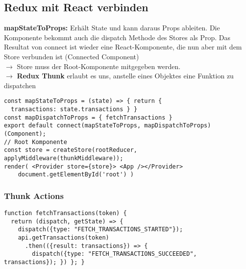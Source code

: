 \subsection{Redux mit React verbinden}
\textcolor{b}{\textbf{mapStateToProps:}} Erhält State und kann daraus Props ableiten. Die Komponente bekommt auch die dispatch Methode des Stores als Prop. Das Resultat von connect ist wieder eine React-Komponente, die nun aber mit dem Store verbunden ist (Connected Component)\\
$\rightarrow$ Store muss der Root-Komponente mitgegeben werden.\\
$\rightarrow$ \textbf{Redux Thunk} erlaubt es uns, anstelle eines Objektes eine Funktion zu dispatchen
\begin{lstlisting}[style=htmlcssjs]
const mapStateToProps = (state) => { return {
  transactions: state.transactions } }
const mapDispatchToProps = { fetchTransactions }
export default connect(mapStateToProps, mapDispatchToProps)(Component);
// Root Komponente
const store = createStore(rootReducer, applyMiddleware(thunkMiddleware));
render( <Provider store={store}> <App /></Provider>
    document.getElementById('root') )
\end{lstlisting}
\subsubsection{Thunk Actions}
\begin{lstlisting}[style=htmlcssjs]
function fetchTransactions(token) {
  return (dispatch, getState) => {
    dispatch({type: "FETCH_TRANSACTIONS_STARTED"});
    api.getTransactions(token)
      .then(({result: transactions}) => {
        dispatch({type: "FETCH_TRANSACTIONS_SUCCEEDED", transactions}); }) }; }
\end{lstlisting}
